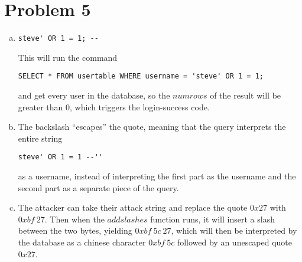 \documentclass{article}
\begin{document}
\section*{Problem 5}
\begin{enumerate}[(a)]
\item \begin{verbatim}steve' OR 1 = 1; --\end{verbatim}

This will run the command \begin{verbatim}SELECT * FROM usertable WHERE username = 'steve' OR 1 = 1;\end{verbatim} and get every user in the database, so the $numrows$ of the result will be greater than 0, which triggers the login-success code.
\item The backslash ``escapes'' the quote, meaning that the query interprets the entire string \begin{verbatim}steve' OR 1 = 1 --''\end{verbatim} as a username, instead of interpreting the first part as the username and the second part as a separate piece of the query.
\item The attacker can take their attack string and replace the quote $0x27$ with $0xbf~27$. Then when the $addslashes$ function runs, it will insert a slash between the two bytes, yielding $0xbf~5c~27$, which will then be interpreted by the database as a chinese character $0xbf~5c$ followed by an unescaped quote $0x27$.
\end{enumerate}
\end{document}
